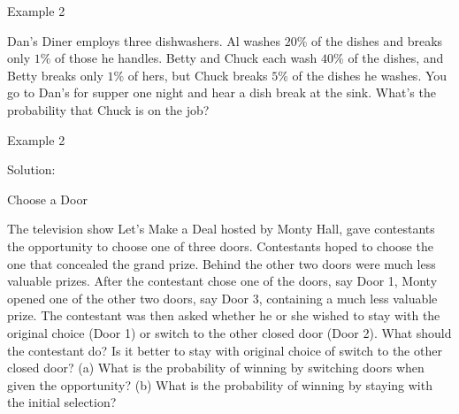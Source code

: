 \documentclass[
  ignorenonframetext,
]{beamer}
\begin{document}
\begin{frame}{Example 2}
\protect\hypertarget{example-2}{}
\begin{tcolorbox}
Dan's Diner employs three dishwashers. Al washes $20\%$ of the dishes and breaks only $1\%$ of those he handles. Betty and Chuck each wash $40\%$ of the dishes, and Betty breaks only $1\%$ of hers, but Chuck breaks $5\%$ of the dishes he washes. You go to Dan's for supper one night and hear a dish break at the sink. What's the probability that Chuck is on the job?


\end{tcolorbox}
\end{frame}

\begin{frame}{Example 2}
\protect\hypertarget{example-2-1}{}
\begin{tcolorbox}
Solution:

\vspace{50mm}


\end{tcolorbox}
\end{frame}

\begin{frame}{Choose a Door}
\protect\hypertarget{choose-a-door}{}
\begin{tcolorbox}
The television show Let's Make a Deal hosted by Monty Hall, gave contestants the opportunity to choose one of three doors. Contestants hoped to choose the one that concealed the grand prize. Behind the other two doors were much less valuable prizes. After the contestant chose one of the doors, say Door 1, Monty opened one of the other two doors, say Door 3, containing a much less valuable prize. The contestant was then asked whether he or she wished to stay with the original choice (Door 1) or switch to the other closed door (Door 2). What should the contestant do? Is it better to stay with original choice of switch to the other closed door? (a) What is the probability of winning by switching doors when given the opportunity? (b) What is the probability of winning by staying with the initial selection?


\end{tcolorbox}
\end{frame}
\end{document}
